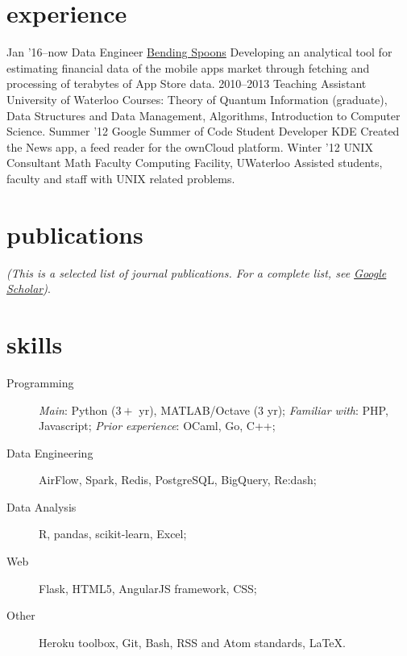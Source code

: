\documentclass[]{friggeri-cv}
\begin{document}
\section{experience}

\begin{entrylist}
  \entry
  {Jan '16–now}
  {Data Engineer}
  {\href{http://www.bendingspoons.com}{Bending Spoons}}
  {Developing an analytical tool for estimating financial data of the mobile apps market through fetching and processing of terabytes of App Store data. }
  \entry
    {2010–2013}
    {Teaching Assistant}
    {University of Waterloo}
    {Courses: Theory of Quantum Information (graduate), Data Structures and Data Management, Algorithms, Introduction to Computer Science.}
  \entry
    {Summer '12}
    {Google Summer of Code Student Developer}
    {KDE}
    {Created the News app, a feed reader for the ownCloud platform.}
  \entry
    {Winter '12}
    {UNIX Consultant}
    {Math Faculty Computing Facility, UWaterloo}
    {Assisted students, faculty and staff with UNIX related problems.}
\end{entrylist}

\section{publications}
\emph{(This is a selected list of journal publications. For a complete list, see \href{https://scholar.google.com/citations?user=MDj6ntQAAAAJ&hl=en}{Google Scholar})}.
\vspace{5mm}
\section{skills}
\begin{description}
\item[Programming] \emph{Main}: Python ($3+$ yr), MATLAB/Octave ($3$ yr); \emph{Familiar with}: PHP, Javascript; \emph{Prior experience}: OCaml, Go, C++;
\item[Data Engineering] AirFlow, Spark, Redis, PostgreSQL, BigQuery, Re:dash;
\item[Data Analysis] R, pandas, scikit-learn, Excel;
\item[Web] Flask, HTML5, AngularJS framework, CSS;
\item[Other] Heroku toolbox, Git, Bash, RSS and Atom standards, \LaTeX.
\end{description}
\end{document}
